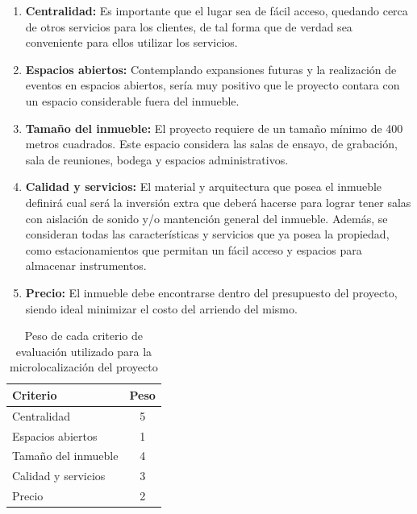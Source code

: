 \begin{enumerate}
    \item \textbf{Centralidad:} Es importante que el lugar sea de fácil acceso,
    quedando cerca de otros servicios para los clientes, de tal forma que de
    verdad sea conveniente para ellos utilizar los servicios.
    \item \textbf{Espacios abiertos:} Contemplando expansiones futuras y la
    realización de eventos en espacios abiertos, sería muy positivo que le
    proyecto contara con un espacio considerable fuera del inmueble.
    \item \textbf{Tamaño del inmueble:} El proyecto requiere de un tamaño
    mínimo de 400 metros cuadrados. Este espacio considera las salas de
    ensayo, de grabación, sala de reuniones, bodega y espacios administrativos.
    \item \textbf{Calidad y servicios:} El material y arquitectura que posea
    el inmueble definirá cual será la inversión extra que deberá hacerse para
    lograr tener salas con aislación de sonido y/o mantención general del
    inmueble. Además, se consideran todas las características y servicios que
    ya posea la propiedad, como estacionamientos que permitan
    un fácil acceso y espacios para almacenar instrumentos.
    \item \textbf{Precio:} El inmueble debe encontrarse dentro del presupuesto
    del proyecto, siendo ideal minimizar el costo del arriendo del mismo.
\end{enumerate}

\begin{table}[htb!]
\centering
\begin{tabular}{|l|c|}
\hline
\textbf{Criterio}   & \textbf{Peso}\\
\hline
Centralidad         & 5    \\
Espacios abiertos   & 1   \\
Tamaño del inmueble & 4   \\
Calidad y servicios & 3   \\
Precio              & 2   \\
\hline
\end{tabular}
\caption{Peso de cada criterio de evaluación utilizado para la
microlocalización del proyecto}
\label{tab:resumen}
\end{table}
\newpage
